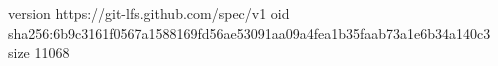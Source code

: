version https://git-lfs.github.com/spec/v1
oid sha256:6b9c3161f0567a1588169fd56ae53091aa09a4fea1b35faab73a1e6b34a140c3
size 11068

